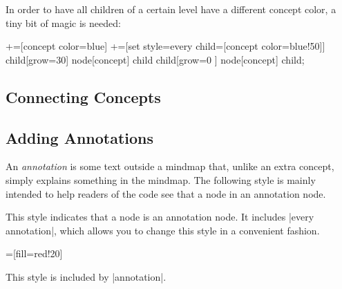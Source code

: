 \begin{itemize}
  In order to have all children of a certain level have a different
  concept color, a tiny bit of magic is needed:
\begin{codeexample}[]
+=[concept color=blue]    
+=[set style={{every child}=[concept color=blue!50]}]    
\tikz[mindmap,text=white]
    child[grow=30] {node[concept] {child}}
    child[grow=0 ] {node[concept] {child}};
\end{codeexample}
\end{itemize}

\subsection{Connecting Concepts}

\subsection{Adding Annotations}

An \emph{annotation} is some text outside a mindmap that, unlike an
extra concept, simply explains something in the mindmap. The following
style is mainly intended to help readers of the code see that a node
in an annotation node.

\begin{itemize}
  This style indicates that a node is an annotation node. It includes
  |every annotation|, which allows you to change this style in a
  convenient fashion.
\begin{codeexample}[]
=[fill=red!20]    
\end{codeexample}
    This style is included by |annotation|.
\end{itemize}



